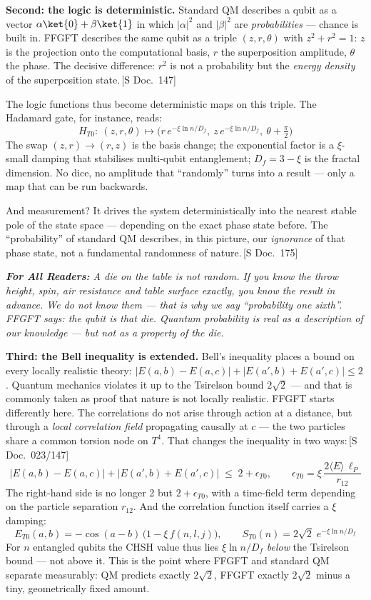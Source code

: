 \documentclass[11pt,oneside]{book}
\newcommand{\status}[1]{\penalty10000\,{\scriptsize\textcolor{gray!60}{[#1]}}}
\newenvironment{laierspur}{%
  \par\vspace{4pt}%
  \noindent\small\itshape\color{blue!60!black}%
  \textbf{For All Readers:}\enspace\ignorespaces}{%
  \par\vspace{4pt}\normalsize\normalfont\normalcolor}
\begin{document}
\textbf{Second: the logic is deterministic.}
Standard QM describes a qubit as a vector $\alpha\ket{0}+\beta\ket{1}$
in which $|\alpha|^2$ and $|\beta|^2$ are \textit{probabilities} ---
chance is built in. FFGFT describes the same qubit as a triple
$(z, r, \theta)$ with $z^2 + r^2 = 1$: $z$ is the projection onto the
computational basis, $r$ the superposition amplitude, $\theta$ the phase.
The decisive difference: $r^2$ is not a probability but the
\textit{energy density} of the superposition state.\status{S Doc.~147}

The logic functions thus become deterministic maps on this triple.
The Hadamard gate, for instance, reads:
\[
  H_{T0}:\ (z, r, \theta) \longmapsto
  \bigl(r\,e^{-\xi\ln n/D_f},\ z\,e^{-\xi\ln n/D_f},\ \theta + \tfrac{\pi}{2}\bigr)
\]
The swap $(z,r)\to(r,z)$ is the basis change; the exponential factor is
a $\xi$-small damping that stabilises multi-qubit entanglement;
$D_f = 3-\xi$ is the fractal dimension. No dice, no amplitude that
``randomly'' turns into a result --- only a map that can be run backwards.

And measurement? It drives the system deterministically into the nearest
stable pole of the state space --- depending on the exact phase state
before. The ``probability'' of standard QM describes, in this picture,
our \textit{ignorance} of that phase state, not a fundamental randomness
of nature.\status{S Doc.~175}

\begin{laierspur}
A die on the table is not random. If you know the throw height, spin,
air resistance and table surface exactly, you know the result in advance.
We do not know them --- that is why we say ``probability one sixth''.
FFGFT says: the qubit is that die. Quantum probability is real as a
description of our knowledge --- but not as a property of the die.
\end{laierspur}

\textbf{Third: the Bell inequality is extended.}
Bell's inequality places a bound on every locally realistic theory:
$|E(a,b)-E(a,c)| + |E(a',b)+E(a',c)| \leq 2$. Quantum mechanics violates
it up to the Tsirelson bound $2\sqrt{2}$ --- and that is commonly taken
as proof that nature is not locally realistic. FFGFT starts differently
here. The correlations do not arise through action at a distance, but
through a \textit{local correlation field} propagating causally at $c$
--- the two particles share a common torsion node on $T^4$. That changes
the inequality in two ways:\status{S Doc.~023/147}
\[
  |E(a,b)-E(a,c)| + |E(a',b)+E(a',c)| \;\leq\; 2 + \epsilon_{T0},
  \qquad
  \epsilon_{T0} = \xi\,\frac{2\langle E\rangle\,\ell_P}{r_{12}}
\]
The right-hand side is no longer 2 but $2+\epsilon_{T0}$, with a
time-field term depending on the particle separation $r_{12}$. And the
correlation function itself carries a $\xi$ damping:
\[
  E_{T0}(a,b) = -\cos(a-b)\,\bigl(1 - \xi\,f(n,l,j)\bigr),
  \qquad
  S_{T0}(n) = 2\sqrt{2}\;e^{-\xi\ln n/D_f}
\]
For $n$ entangled qubits the CHSH value thus lies $\xi\ln n/D_f$
\textit{below} the Tsirelson bound --- not above it. This is the point
where FFGFT and standard QM separate measurably: QM predicts exactly
$2\sqrt{2}$, FFGFT exactly $2\sqrt{2}$ minus a tiny, geometrically fixed
amount.
\end{document}
